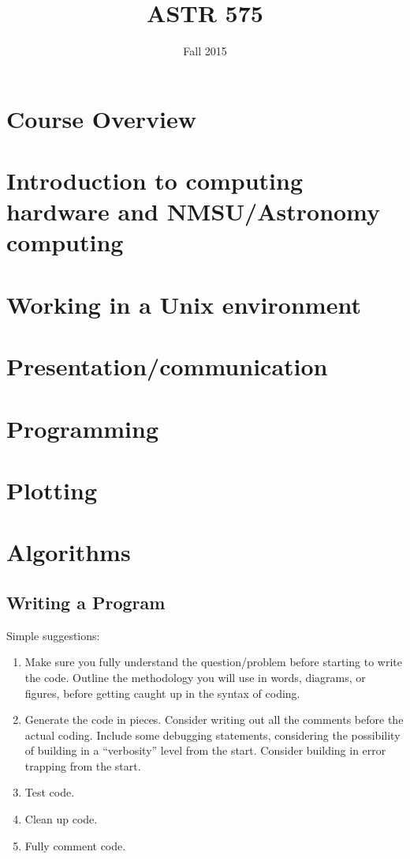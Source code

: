 \documentclass[12pt]{article}
\title{ASTR 575}
\date{Fall 2015}
\begin{document}
\maketitle

\section{Course Overview}
\section{Introduction to computing hardware and NMSU/Astronomy computing}
\section{Working in a Unix environment}
\section{Presentation/communication}
\section{Programming}
\section{Plotting}
\section{Algorithms}

\subsection{Writing a Program}
Simple suggestions:
\begin{enumerate}
    \item Make sure you fully understand the question/problem before
        starting to write the code. Outline the methodology you will
        use in words, diagrams,
        or figures, before getting caught up in the syntax of coding.
    \item Generate the code in pieces. Consider writing out all the comments
        before the actual coding. Include some debugging statements, considering
        the possibility of building in a ``verbosity'' level from the start.
        Consider building in error trapping from the start.
    \item Test code.
    \item Clean up code.
    \item Fully comment code.
\end{enumerate}
\end{document}
